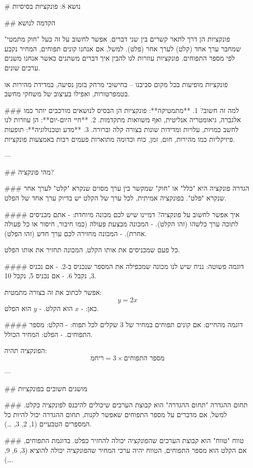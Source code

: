 # נושא 8: פונקציות בסיסיות

## הקדמה לנושא

פונקציות הן דרך לתאר קשרים בין שני דברים. אפשר לחשוב על זה כעל "חוק מתמטי" שמחבר ערך אחד (קלט) לערך אחר (פלט). 
למשל, אם אנחנו קונים תפוחים, המחיר נקבע לפי מספר התפוחים. פונקציות עוזרות לנו להבין איך דברים משתנים כאשר אנחנו משנים ערכים שונים. 

פונקציות מופיעות בכל מקום סביבנו – בחישובי מרחק בזמן נסיעה, במדידת מהירות או בטמפרטורות, ואפילו בעיצוב של משחקי מחשב. 

### למה זה חשוב?
1. **מתמטיקה**: פונקציות הן הבסיס לנושאים מורכבים יותר כמו אלגברה, גיאומטריה אנליטית, ואף משוואות מתקדמות.
2. **חיי היום-יום**: הן עוזרות לנו לחשב כמויות, עלויות ומדידות שונות בצורה קלה וברורה.
3. **מדע וטכנולוגיה**: תופעות פיזיקליות כמו מהירות, חום, זמן, כוח וכדומה מתוארות פעמים רבות באמצעות פונקציות.

---

## מהי פונקציה?

### הגדרה
פונקציה היא "כלל" או "חוק" שמקשר בין ערך מסוים שנקרא "קלט" לערך אחר שנקרא "פלט". 
בפונקציה אמיתית, לכל ערך של הקלט יש בדיוק ערך אחד של הפלט. 

#### איך אפשר לחשוב על פונקציה?
דמיינו שיש לכם מכונה מיוחדת:
- אתם מכניסים לתוכה ערך כלשהו (זהו הקלט).
- המכונה מבצעת פעולה (כמו חיבור, חיסור או כל פעולה אחרת).
- המכונה מחזירה לכם ערך חדש (זהו הפלט).

כל פעם שמכניסים את אותו הקלט, המכונה תחזיר את אותו הפלט.

#### דוגמה פשוטה:
נניח שיש לנו מכונה שמכפילה את המספר שנכניס ב-2. 
- אם נכניס 3, נקבל 6. 
- אם נכניס 5, נקבל 10.

אפשר לכתוב את זה בצורה מתמטית:
$$
 y = 2x 
$$
כאן:
- $x$ הוא הקלט.
- $y$ הוא הפלט.

#### דוגמה מהחיים:
אם קונים תפוחים במחיר של 3 שקלים לכל תפוח:
- הקלט: מספר התפוחים.
- הפלט: המחיר הכולל.

הפונקציה תהיה:
$$
 מחיר = 3 \times \text{מספר התפוחים} 
$$

---

## מושגים חשובים בפונקציות

### תחום ההגדרה
"תחום ההגדרה" הוא קבוצת הערכים שיכולים להיכנס לפונקציה כקלט. 
למשל, אם מדברים על מספר התפוחים שאפשר לקנות, תחום ההגדרה יכול להיות כל המספרים הטבעיים (1, 2, 3, …).

### טווח
"טווח" הוא קבוצת הערכים שהפונקציה יכולה להחזיר כפלט. 
בדוגמת התפוחים, אם הקלט הוא מספר התפוחים, הטווח יהיה ערכי המחיר שהפונקציה יכולה להוציא (3, 6, 9, …).

